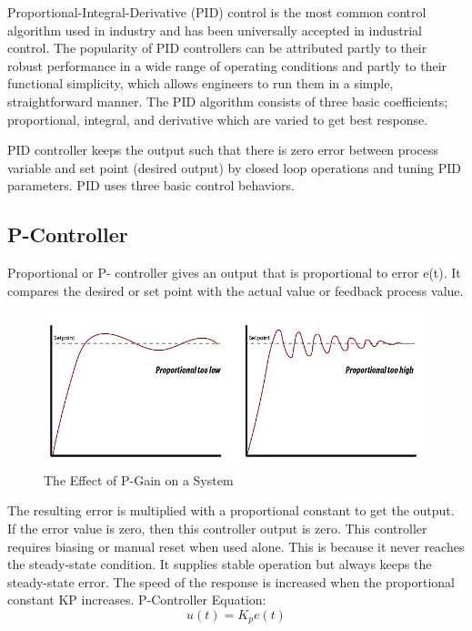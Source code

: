 \documentclass[12pt,a4paper]{book}
\begin{document}
Proportional-Integral-Derivative (PID) control is the most common control algorithm used in industry and has been universally accepted in industrial control. The popularity of PID controllers can be attributed partly to their robust performance in a wide range of operating conditions and partly to their functional simplicity, which allows engineers to run them in a simple, straightforward manner. The PID algorithm consists of three basic coefficients; proportional, integral, and derivative which are varied to get best response. 

PID controller keeps the output such that there is zero error between process variable and set point (desired output) by closed loop operations and tuning PID parameters. PID uses three basic control behaviors. 
\subsection{P-Controller}
Proportional or P- controller gives an output that is proportional to error e(t). It compares the desired or set point with the actual value or feedback process value. 

\begin{figure}[h]
  \centering
  \includegraphics[width=15cm]{image8.png}
  \caption{The Effect of P-Gain on a System}
  \label{fig:image8}
\end{figure}

The resulting error is multiplied with a proportional constant to get the output. If the error value is zero, then this controller output is zero. This controller requires biasing or manual reset when used alone. This is because it never reaches the steady-state condition. It supplies stable operation but always keeps the steady-state error. The speed of the response is increased when the proportional constant KP increases. P-Controller Equation:
\begin{equation}
  u\left(t\right)=K_pe(t)
  \label{equation:eq1}
\end{equation}
\end{document}
